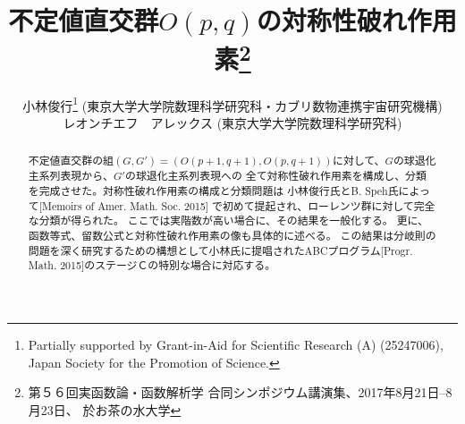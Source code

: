 \documentclass[12pt]{article} %
\theoremstyle{definition}
\theoremstyle{exampstyle} \newtheorem{examp}[theorem]{Theorem}
\begin{document}
\renewcommand{\abstractname}{概要}

\title{不定値直交群$O(p,q)$の対称性破れ作用素\thanks{第５６回実函数論・函数解析学 合同シンポジウム講演集、2017年8月21日--8月23日、
於\;お茶の水大学}}

\author{小林俊行\thanks{Partially supported by Grant-in-Aid for Scientific
Research (A) (25247006), Japan Society for the Promotion of Science.} (東京大学\;大学院数理科学研究科{・}カブリ数物連携宇宙研究機構)\\
  レオンチエフ　アレックス (東京大学\;大学院数理科学研究科)}




  \maketitle
\begin{abstract}
	不定値直交群の組$(G, G') =(O(p+1, q+1), O(p,q+1))$に対して、$G$の球退化主系列表現から、$G'$の球退化主系列表現への
	全て対称性破れ作用素を構成し、分類
	を完成させた。対称性破れ作用素の構成と分類問題{は}
	小林俊行氏とB. Speh氏によって[Memoirs of Amer. Math. Soc. 2015]
	で初めて提起され、ローレンツ群に対して完全な分類が得られた。
	ここでは実階数が高い場合に、その結果を一般化する。
	更に、函数等式、留数公式と対称性破れ作用素の像も具体的に述べる。
	この結果は分岐則の問題を深く研究するための構想として小林氏に提唱されたABCプログラム[Progr. Math. 2015]のステージＣの特別な場合に対応する。
\end{abstract}
\end{document}
